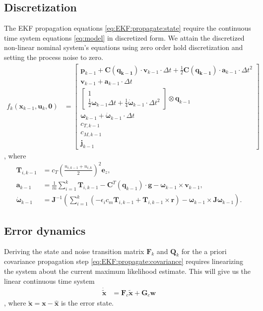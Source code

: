 \documentclass[10pt,a4paper]{article}
\begin{document}
\subsection*{Discretization}
The EKF propagation equations \ref{eq:EKF:propagate:state} require the continuous time system equations \ref{eq:model} in discretized form. We attain the discretized non-linear nominal system's equations using zero order hold discretization and setting the process noise to zero.
\begin{align}
f_k(\mathbf{x}_{k-1},\mathbf{u}_k, \mathbf{0}) &= \begin{bmatrix}
\mathbf{p}_{k-1} + \mathbf{C}(\mathbf{q_{k-1}}) \cdot \mathbf{v}_{k-1} \cdot \Delta t + \frac{1}{2} \mathbf{C}(\mathbf{q_{k-1}}) \cdot \mathbf{a}_{k-1} \cdot \Delta t ^2 \\
\mathbf{v}_{k-1} + \mathbf{a}_{k-1} \cdot \Delta t \\
\begin{bmatrix}
1 \\ \frac{1}{2} \boldsymbol{\omega}_{k-1} \Delta t + \frac{1}{4} \dot{\boldsymbol{\omega}}_{k-1} \cdot \Delta t ^2
\end{bmatrix} \otimes \mathbf{q}_{k-1} \\
\boldsymbol{\omega}_{k-1} + \dot{\boldsymbol{\omega}}_{k-1} \cdot \Delta t \\
c_{T,k-1} \\
c_{M,k-1} \\
\mathbf{j}_{k-1}
\end{bmatrix}
\end{align}
, where
\begin{align}
\mathbf{T}_{i,k-1} &= c_T \left( \frac{n_{i,k-1} + n_{i,k}}{2} \right) ^2 \mathbf{e}_z, \\
\mathbf{a}_{k-1} &= \frac{1}{m} \sum_{i=1}^k \mathbf{T}_{i,k-1}  - \mathbf{C}^T(\mathbf{q}_{k-1}) \cdot \mathbf{g} - \boldsymbol{\omega}_{k-1} \times \mathbf{v}_{k-1},  \\
\dot{\boldsymbol{\omega}}_{k-1} &= \mathbf{J}^{-1} \left(  \sum_{i=1}^k \left(-\epsilon_i  c_m \mathbf{T}_{i,k-1} + \mathbf{T}_{i,k-1} \times \mathbf{r} \right) - \boldsymbol{\omega}_{k-1} \times \mathbf{J} \boldsymbol{\omega}_{k-1} \right).
\end{align}

\subsection*{Error dynamics}
Deriving the state and noise transition matrix $\mathbf{F}_k$ and $\mathbf{Q}_k$ for the a priori covariance propagation step \ref{eq:EKF:propagate:covariance} requires linearizing the system about the current maximum likelihood estimate. This will give us the linear continuous time system
\begin{align}
\dot{\tilde{\mathbf{x}}} &= \mathbf{F}_c \tilde{\mathbf{x}} + \mathbf{G}_c \mathbf{w}
\end{align}
, where $\tilde{\mathbf{x}} = \mathbf{x} - \hat{\mathbf{x}}$ is the error state. 
\end{document}

